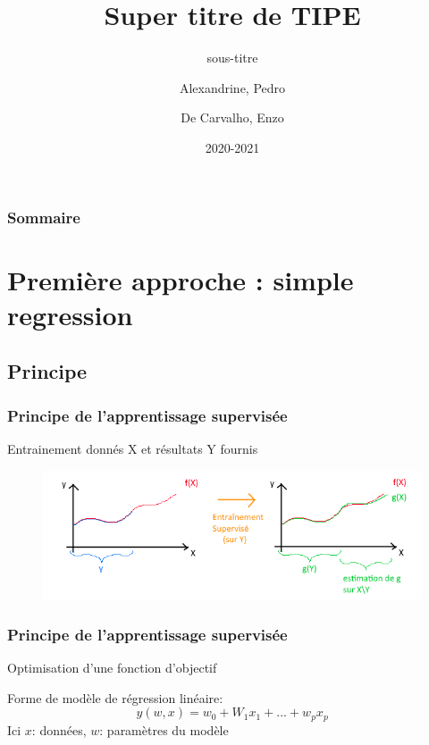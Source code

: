 \documentclass{beamer}
\title{Super titre de TIPE}
\subtitle{sous-titre}
\author{Alexandrine, Pedro\\\and De Carvalho, Enzo}
\date{2020-2021}
\begin{document}
\begin{frame}
	\maketitle
\end{frame}

\begin{frame}
	\frametitle{Sommaire}
	\tableofcontents
\end{frame}

\section{Première approche : simple regression}
\subsection{Principe}
\begin{frame}
	\frametitle{Principe de l'apprentissage supervisée}
	Entrainement donnés X et résultats Y fournis
	\begin{figure}[b]
		\centering
		\includegraphics[scale=0.65]{super_schema}
	\end{figure}
\end{frame}

\begin{frame}
	\frametitle{Principe de l'apprentissage supervisée}
	Optimisation d'une fonction d'objectif
	
	Forme de modèle de régression linéaire:
	\[y(w,x)=w_0+W_1x_1+...+w_px_p\]
	Ici $x$: données, $w$: paramètres du modèle
\end{frame}
\end{document}
